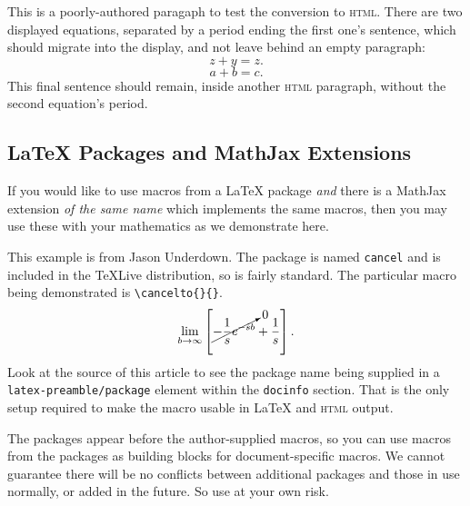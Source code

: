 \documentclass[10pt,]{article}
\newcommand{\initialism}[1]{\textsc{\MakeLowercase{#1}}}
\theoremstyle{plain}
\theoremstyle{definition}
\theoremstyle{definition}
\theoremstyle{definition}
\theoremstyle{definition}
\theoremstyle{definition}
\theoremstyle{definition}
\numberwithin{equation}{section}
\begin{document}
\hypertarget{p-189}{}%
This is a poorly-authored paragaph to test the conversion to \initialism{HTML}.  There are two displayed equations, separated by a period ending the first one's sentence, which should migrate into the display, and not leave behind an empty paragraph:%
\begin{equation*}
z+y = z\text{.}
\end{equation*}
%
\begin{equation*}
a + b = c\text{.}
\end{equation*}
This final sentence should remain, inside another \initialism{HTML} paragraph, without the second equation's period.%
\typeout{************************************************}
\typeout{************************************************}
\subsection[{\LaTeX{} Packages and MathJax Extensions}]{\LaTeX{} Packages and MathJax Extensions}\label{subsection-10}
\hypertarget{p-190}{}%
If you would like to use macros from a \LaTeX{} package \emph{and} there is a MathJax extension \emph{of the same name} which implements the same macros, then you may use these with your mathematics as we demonstrate here.%
\par
\hypertarget{p-191}{}%
This example is from Jason Underdown.  The package is named \lstinline?cancel? and is included in the TeXLive distribution, so is fairly standard.  The particular macro being demonstrated is \lstinline?\cancelto{}{}?.%
\begin{equation*}
\lim_{b \rightarrow \infty}\left[\cancelto{0}{-\frac{1}{s}e^{-sb}} + \frac{1}{s}\right]\text{.}
\end{equation*}
Look at the source of this article to see the package name being supplied in a \lstinline?latex-preamble/package? element within the \lstinline?docinfo? section.  That is the only setup required to make the macro usable in \LaTeX{} and \initialism{HTML} output.%
\par
\hypertarget{p-192}{}%
The packages appear before the author-supplied macros, so you can use macros from the packages as building blocks for document-specific macros.  We cannot guarantee there will be no conflicts between additional packages and those in use normally, or added in the future.  So use at your own risk.%
\typeout{************************************************}
\typeout{************************************************}
\end{document}
